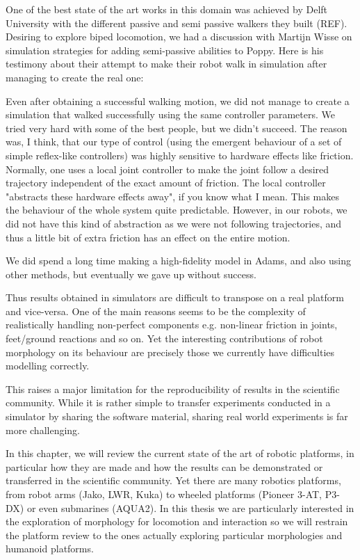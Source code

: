 One of the best state of the art works in this domain was achieved by Delft University with the different passive and semi passive walkers they built (REF). Desiring to explore biped locomotion, we had a discussion with Martijn Wisse on simulation strategies for adding semi-passive abilities to Poppy. Here is his testimony about their attempt to make their robot walk in simulation after managing to create the real one:

\begin{formal}

Even after obtaining a successful walking motion, we did not manage to create a simulation that walked successfully using the same controller parameters. We tried very hard with some of the best people, but we didn’t succeed. The reason was, I think, that our type of control (using the emergent behaviour of a set of simple reflex-like controllers) was highly sensitive to hardware effects like friction. Normally, one uses a local joint controller to make the joint follow a desired trajectory independent of the exact amount of friction. The local controller "abstracts these hardware effects away", if you know what I mean. This makes the behaviour of the whole system quite predictable. However, in our robots, we did not have this kind of abstraction as we were not following trajectories, and thus a little bit of extra friction has an effect on the entire motion.

We did spend a long time making a high-fidelity model in Adams, and also using other methods, but eventually we gave up without success.

\end{formal}

Thus results obtained in simulators are difficult to transpose on a real platform and vice-versa. One of the main reasons seems to be the complexity of realistically handling non-perfect components e.g. non-linear friction in joints, feet/ground reactions and so on. Yet the interesting contributions of robot morphology on its behaviour are precisely those we currently have difficulties modelling correctly.

This raises a major limitation for the reproducibility of results in the scientific community. While it is rather simple to transfer experiments conducted in a simulator by sharing the software material, sharing real world experiments is far more challenging.

In this chapter, we will review the current state of the art of robotic platforms, in particular how they are made and how the results can be demonstrated or transferred in the scientific community. Yet there are many robotics platforms, from robot arms (Jako, LWR, Kuka) to wheeled platforms (Pioneer 3-AT, P3-DX) or even submarines (AQUA2). In this thesis we are particularly interested in the exploration of morphology for locomotion and interaction so we will restrain the platform review to the ones actually exploring particular morphologies and humanoid platforms.


